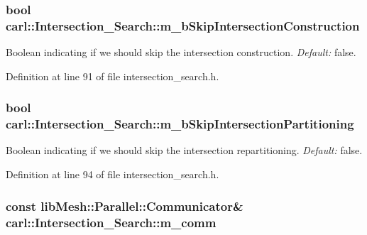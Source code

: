 \subsubsection[{m\+\_\+b\+Skip\+Intersection\+Construction}]{\setlength{\rightskip}{0pt plus 5cm}bool carl\+::\+Intersection\+\_\+\+Search\+::m\+\_\+b\+Skip\+Intersection\+Construction\hspace{0.3cm}{\ttfamily [protected]}}\label{classcarl_1_1_intersection___search_aef626956ac007f4c737aba3f2f69f2de}


Boolean indicating if we should skip the intersection construction. {\itshape Default\+:} false. 



Definition at line 91 of file intersection\+\_\+search.\+h.

\hypertarget{classcarl_1_1_intersection___search_aab4276c3ba5b247b46300de675a10cb4}{}
\subsubsection[{m\+\_\+b\+Skip\+Intersection\+Partitioning}]{\setlength{\rightskip}{0pt plus 5cm}bool carl\+::\+Intersection\+\_\+\+Search\+::m\+\_\+b\+Skip\+Intersection\+Partitioning\hspace{0.3cm}{\ttfamily [protected]}}\label{classcarl_1_1_intersection___search_aab4276c3ba5b247b46300de675a10cb4}


Boolean indicating if we should skip the intersection repartitioning. {\itshape Default\+:} false. 



Definition at line 94 of file intersection\+\_\+search.\+h.

\hypertarget{classcarl_1_1_intersection___search_a69fe381ecd45f4cdcb4810294aa88eaa}{}
\subsubsection[{m\+\_\+comm}]{\setlength{\rightskip}{0pt plus 5cm}const lib\+Mesh\+::\+Parallel\+::\+Communicator\& carl\+::\+Intersection\+\_\+\+Search\+::m\+\_\+comm\hspace{0.3cm}{\ttfamily [protected]}}\label{classcarl_1_1_intersection___search_a69fe381ecd45f4cdcb4810294aa88eaa}


